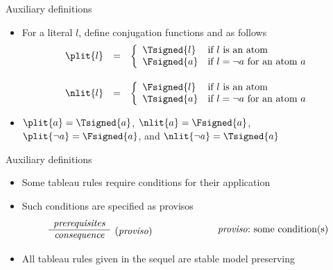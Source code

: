 \begin{frame}{Auxiliary definitions}
  \bigskip
  \begin{itemize}
  \item<1->
    For a literal $l$, define conjugation functions \plit{} and \nlit{} as follows
    \[
    \begin{array}{rcl}
      \plit{l}
      &=&
      \left\{
        \begin{array}{ll}
          \Tsigned{l}&\text{if $l$ is an atom} %
          \\
          \Fsigned{a}&\text{if $l=\neg a$ for an atom $a$} %
        \end{array}
      \right.
      \\[20pt]
      \nlit{l}
      &=&
      \left\{
        \begin{array}{ll}
          \Fsigned{l}&\text{if $l$ is an atom} %
          \\
          \Tsigned{a}&\text{if $l=\neg a$ for an atom $a$} %
        \end{array}
      \right.
    \end{array}
    \]
  \item<2-> 
    $\plit{a}=\Tsigned{a}$, $\nlit{a}=\Fsigned{a}$, $\plit{\neg a}=\Fsigned{a}$, and $\nlit{\neg a}=\Tsigned{a}$
\end{itemize}
\end{frame}
\begin{frame}{Auxiliary definitions}
  \begin{itemize}
  \item Some tableau rules require conditions for their application
  \item Such conditions are specified as \alert{provisos}
    \[
    \begin{array}{lcr}
      \begin{array}{cl}
        \textit{prerequisites} &
        \raisebox{-8pt}[0pt][0pt]{(\textit{proviso})}
        \\\cline{1-1}
        \textit{consequence}
      \end{array}
      & \hspace{1.5cm} &
      \textit{proviso\/}{:}\text{ some condition(s)}
    \end{array}
    \]
    \bigskip
  \item {} All tableau rules given in the sequel are stable model preserving
  \end{itemize}
\end{frame}

